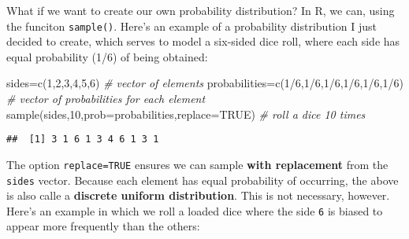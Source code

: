 \documentclass[
]{book}
\newenvironment{Shaded}{\begin{snugshade}}{\end{snugshade}}
\newcommand{\AttributeTok}[1]{\textcolor[rgb]{0.77,0.63,0.00}{#1}}
\newcommand{\CommentTok}[1]{\textcolor[rgb]{0.56,0.35,0.01}{\textit{#1}}}
\newcommand{\ConstantTok}[1]{\textcolor[rgb]{0.00,0.00,0.00}{#1}}
\newcommand{\DecValTok}[1]{\textcolor[rgb]{0.00,0.00,0.81}{#1}}
\newcommand{\FunctionTok}[1]{\textcolor[rgb]{0.00,0.00,0.00}{#1}}
\newcommand{\NormalTok}[1]{#1}
\newcommand{\OtherTok}[1]{\textcolor[rgb]{0.56,0.35,0.01}{#1}}
\newcommand{\SpecialCharTok}[1]{\textcolor[rgb]{0.00,0.00,0.00}{#1}}
\begin{document}
What if we want to create our own probability distribution? In R, we can, using the funciton \texttt{sample()}. Here's an example of a probability distribution I just decided to create, which serves to model a six-sided dice roll, where each side has equal probability (1/6) of being obtained:

\begin{Shaded}
\begin{Highlighting}[]
\NormalTok{sides}\OtherTok{=}\FunctionTok{c}\NormalTok{(}\DecValTok{1}\NormalTok{,}\DecValTok{2}\NormalTok{,}\DecValTok{3}\NormalTok{,}\DecValTok{4}\NormalTok{,}\DecValTok{5}\NormalTok{,}\DecValTok{6}\NormalTok{) }\CommentTok{\# vector of elements}
\NormalTok{probabilities}\OtherTok{=}\FunctionTok{c}\NormalTok{(}\DecValTok{1}\SpecialCharTok{/}\DecValTok{6}\NormalTok{,}\DecValTok{1}\SpecialCharTok{/}\DecValTok{6}\NormalTok{,}\DecValTok{1}\SpecialCharTok{/}\DecValTok{6}\NormalTok{,}\DecValTok{1}\SpecialCharTok{/}\DecValTok{6}\NormalTok{,}\DecValTok{1}\SpecialCharTok{/}\DecValTok{6}\NormalTok{,}\DecValTok{1}\SpecialCharTok{/}\DecValTok{6}\NormalTok{) }\CommentTok{\# vector of probabilities for each element}
\FunctionTok{sample}\NormalTok{(sides,}\DecValTok{10}\NormalTok{,}\AttributeTok{prob=}\NormalTok{probabilities,}\AttributeTok{replace=}\ConstantTok{TRUE}\NormalTok{) }\CommentTok{\# roll a dice 10 times}
\end{Highlighting}
\end{Shaded}

\begin{verbatim}
##  [1] 3 1 6 1 3 4 6 1 3 1
\end{verbatim}

The option \texttt{replace=TRUE} ensures we can sample \textbf{with replacement} from the \texttt{sides} vector. Because each element has equal probability of occurring, the above is also calle a \textbf{discrete uniform distribution}. This is not necessary, however. Here's an example in which we roll a loaded dice where the side \texttt{6} is biased to appear more frequently than the others:
\end{document}
